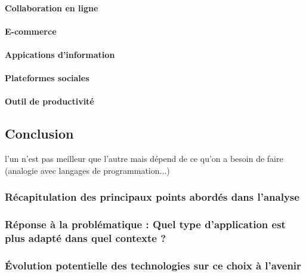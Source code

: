 \documentclass[a4paper, 12pt, french]{article}
\begin{document}
				\paragraph{Collaboration en ligne\\}
				\paragraph{E-commerce\\}
				\paragraph{Appications d'information\\}
				\paragraph{Plateformes sociales\\}
				\paragraph{Outil de productivité\\}
				
		\subsection{Conclusion}
			l'un n'est pas meilleur que l'autre mais dépend de ce qu'on a besoin de faire (analogie avec langages de programmation...)

			\subsubsection{Récapitulation des principaux points abordés dans l'analyse}
			
			\subsubsection{Réponse à la problématique : Quel type d'application est plus adapté dans quel contexte ?}
			
			\subsubsection{Évolution potentielle des technologies sur ce choix à l'avenir}
			
	\newpage
\end{document}
